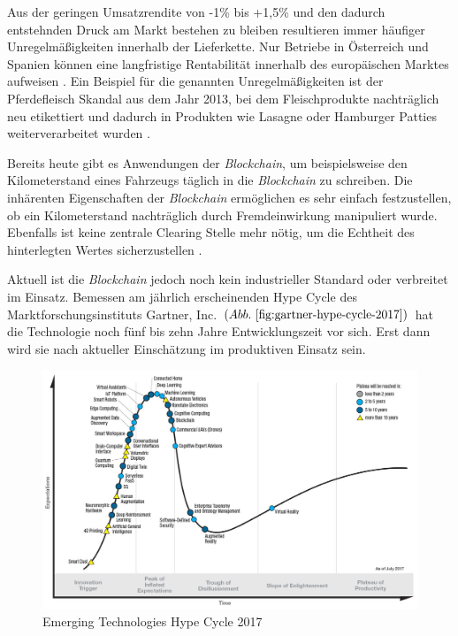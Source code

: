 
Aus der geringen Umsatzrendite von -1\% bis +1,5\%  und den dadurch entstehnden Druck am Markt bestehen zu bleiben resultieren immer häufiger Unregelmäßigkeiten innerhalb der Lieferkette. Nur Betriebe in Österreich und Spanien können eine langfristige Rentabilität innerhalb des europäischen Marktes aufweisen \citep{Efken2015}. Ein Beispiel für die genannten Unregelmäßigkeiten ist der Pferdefleisch Skandal aus dem Jahr 2013, bei dem Fleischprodukte nachträglich neu etikettiert und dadurch in Produkten wie Lasagne oder Hamburger Patties weiterverarbeitet wurden \citep{Bundespartei}.

Bereits heute gibt es Anwendungen der \textit{Blockchain}, um beispielsweise den Kilometerstand eines Fahrzeugs täglich \glqq in die \textit{Blockchain}\grqq{} zu schreiben. Die inhärenten Eigenschaften der \textit{Blockchain} ermöglichen es sehr einfach festzustellen, ob ein Kilometerstand nachträglich durch Fremdeinwirkung manipuliert wurde. Ebenfalls ist keine zentrale \glqq Clearing Stelle\grqq{} mehr nötig, um die Echtheit des hinterlegten Wertes sicherzustellen \citep{carVertical}.

Aktuell ist die \textit{Blockchain} jedoch noch kein industrieller Standard oder verbreitet im Einsatz. Bemessen am jährlich erscheinenden Hype Cycle des Marktforschungsinstituts Gartner, Inc. $( Abb.~ \ref{fig:gartner-hype-cycle-2017} )$ hat die Technologie noch fünf bis zehn Jahre Entwicklungszeit vor sich. Erst dann wird sie nach aktueller Einschätzung im produktiven Einsatz sein.

\begin{figure}[h!]
	\centering
	\includegraphics[width=0.68\linewidth]{pictures/Gartner-Hype-Cycle-2017}
	\caption[Gartner Hype Cycle 2017]{Emerging Technologies Hype Cycle 2017\citep{Gartner2017}}
	\label{fig:gartner-hype-cycle-2017}
\end{figure}

